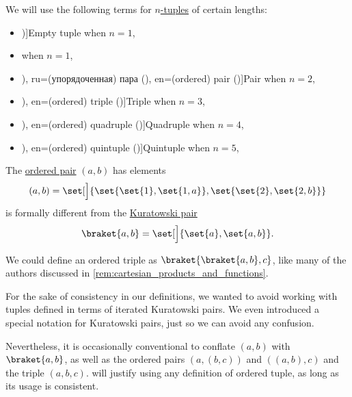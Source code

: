 \begin{definition}\label{def:ordered_tuple_length_terminology}
  We will use the following terms for \hyperref[def:ordered_tuple]{\( n \)-tuples} of certain lengths:
  \begin{itemize}
    \item \term[en=empty tuple (\cite[example 3.5.10]{Tao2022AnalysisI})]{Empty tuple} when \( n = 1 \),
    \item {} when \( n = 1 \),
    \item \term[bg=наредена двойка (\cite[367]{ГеновМиховскиМоллов1991Алгебра}), ru=(упорядоченная) пара (\cite[38]{БелоусовТкачёв2004ДискретнаяМатематика}), en=(ordered) pair (\cite[23]{Halmos1960NaiveSetTheory})]{Pair} when \( n = 2 \),
    \item \term[ru=(упорядоченная) тройка (\cite[39]{БелоусовТкачёв2004ДискретнаяМатематика}), en=(ordered) triple (\cite[42]{Enderton1977SetTheory})]{Triple} when \( n = 3 \),
    \item \term[ru=(упорядоченная) четвёрка (\cite[39]{БелоусовТкачёв2004ДискретнаяМатематика}), en=(ordered) quadruple (\cite[42]{Enderton1977SetTheory})]{Quadruple} when \( n = 4 \),
    \item \term[ru=(упорядоченная) пятёрка (\cite[39]{БелоусовТкачёв2004ДискретнаяМатематика}), en=(ordered) quintuple (\cite[42]{Enderton1977SetTheory})]{Quintuple} when \( n = 5 \),
  \end{itemize}
\end{definition}

\begin{remark}\label{rem:kuratowski_pairs_and_tuples}
  The \hyperref[def:ordered_tuple]{ordered pair} \( (a, b) \) has elements
  \begin{equation*}
    (a, b) = \set[\Big]{ \set{ \set{ 1 }, \set{ 1, a } }, \set{ \set{ 2 }, \set{ 2, b } } }
  \end{equation*}
  is formally different from the \hyperref[def:kuratowski_pair]{Kuratowski pair}
  \begin{equation*}
    \braket{ a, b } = \set[\Big]{ \set{ a }, \set{ a, b } }.
  \end{equation*}

  We could define an ordered triple as \( \braket{ \braket{ a, b }, c } \), like many of the authors discussed in \cref{rem:cartesian_products_and_functions}.

  For the sake of consistency in our definitions, we wanted to avoid working with tuples defined in terms of iterated Kuratowski pairs. We even introduced a special notation for Kuratowski pairs, just so we can avoid any confusion.

  Nevertheless, it is occasionally conventional to conflate \( (a, b) \) with \( \braket{ a, b } \), as well as the ordered pairs \( (a, (b, c)) \) and \( ((a, b), c) \) and the triple \( (a, b, c) \).  will justify using any definition of ordered tuple, as long as its usage is consistent.
\end{remark}

